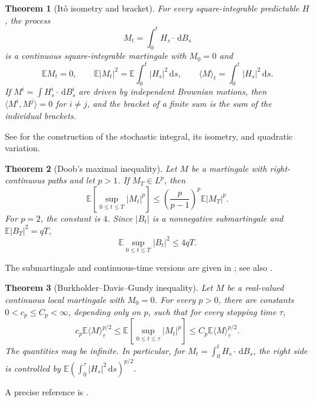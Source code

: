 \documentclass[11pt]{amsart}
\numberwithin{equation}{section}
\theoremstyle{plain}
\newtheorem{theorem}{Theorem}[section]
\newcommand{\E}{\mathbb{E}}
\newcommand{\dd}{\,\mathrm{d}}
\newcommand{\abs}[1]{\left\lvert#1\right\rvert}
\begin{document}
\begin{theorem}[It\^o isometry and bracket]
\label{thm:appendix-ito-isometry}
For every square-integrable predictable $H$, the process
\[
 M_t=\int_0^tH_s\cdot\dd B_s
\]
is a continuous square-integrable martingale with $M_0=0$ and
\begin{equation}\label{eq:appendix-ito-isometry}
 \E M_t=0,\qquad
 \E\abs{M_t}^2=\E\int_0^t\abs{H_s}^2\dd s,\qquad
 \langle M\rangle_t=\int_0^t\abs{H_s}^2\dd s.
\end{equation}
If $M^i=\int H_s^i\cdot\dd B_s^i$ are driven by independent Brownian
motions, then $\langle M^i,M^j\rangle=0$ for $i\ne j$, and the bracket of a
finite sum is the sum of the individual brackets.
\end{theorem}
See \cite[Chapter~3, Section~2]{KaratzasShreve1991} for the construction of
the stochastic integral, its isometry, and quadratic variation.

\begin{theorem}[Doob's maximal inequality]
\label{thm:appendix-doob}
Let $M$ be a martingale with right-continuous paths and let $p>1$.  If
$M_T\in L^p$, then
\begin{equation}\label{eq:appendix-doob}
 \E\left[\sup_{0\leq t\leq T}\abs{M_t}^p\right]
 \leq\left(\frac{p}{p-1}\right)^p\E\abs{M_T}^p.
\end{equation}
For $p=2$, the constant is $4$.  Since $\abs{B_t}$ is a nonnegative
submartingale and $\E\abs{B_T}^2=qT$,
\begin{equation}\label{eq:appendix-brownian-max}
 \E\sup_{0\leq t\leq T}\abs{B_t}^2\leq4qT.
\end{equation}
\end{theorem}
The submartingale and continuous-time versions are given in
\cite[Chapter~II, Section~1]{RevuzYor1999}; see also
\cite[Chapter~1, Section~3]{KaratzasShreve1991}.

\begin{theorem}[Burkholder--Davis--Gundy inequality]
\label{thm:appendix-bdg}
Let $M$ be a real-valued continuous local martingale with $M_0=0$.  For every
$p>0$, there are constants $0<c_p\leq C_p<\infty$, depending only on $p$,
such that for every stopping time $\tau$,
\begin{equation}\label{eq:appendix-bdg}
 c_p\E\langle M\rangle_\tau^{p/2}
 \leq\E\left[\sup_{0\leq t\leq\tau}\abs{M_t}^p\right]
 \leq C_p\E\langle M\rangle_\tau^{p/2}.
\end{equation}
The quantities may be infinite.  In particular, for
$M_t=\int_0^tH_s\cdot\dd B_s$, the right side is controlled by
$\E(\int_0^\tau\abs{H_s}^2\dd s)^{p/2}$.
\end{theorem}
A precise reference is \cite[Chapter~IV, Theorem~4.1]{RevuzYor1999}.
\end{document}
